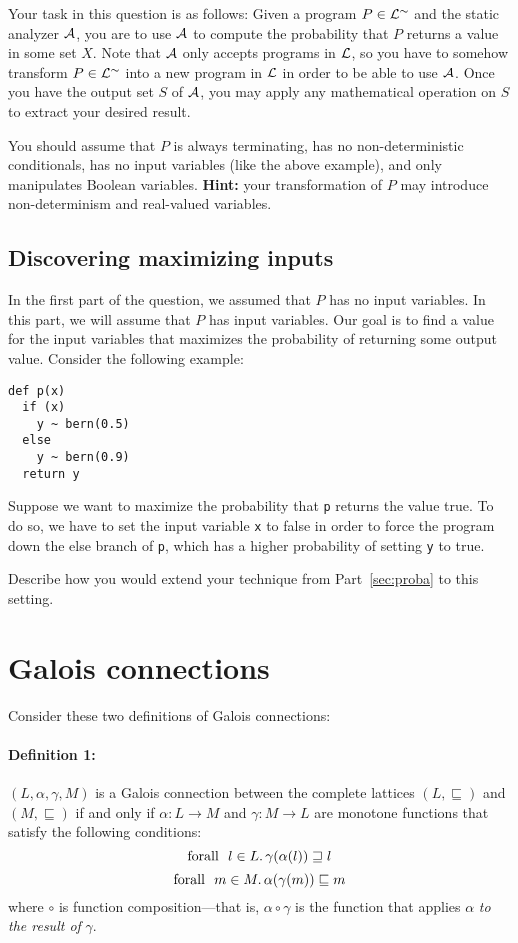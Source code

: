 \documentclass[11pt, oneside]{article}   	%
\begin{document}
Your task in this question is as follows:
Given a program $P \in \mathcal{L}^\sim$ and the static
analyzer $\mathcal{A}$, you are to use $\mathcal{A}$
to compute the probability that $P$ returns
a value in some set $X$.
Note that $\mathcal{A}$ only accepts programs in $\mathcal{L}$,
so you have to somehow transform $P \in \mathcal{L}^\sim$ into a new
program in $\mathcal{L}$
in order to be able to use $\mathcal{A}$.
Once you have the output set $S$ of $\mathcal{A}$,
you may apply any mathematical  operation on $S$ to
extract your desired result.

You should assume that $P$ is always terminating,
has no non-deterministic conditionals,
has no input variables (like the above example),
and only manipulates Boolean variables.
\textbf{Hint:} your transformation of $P$
may introduce non-determinism and real-valued variables.

\subsection{Discovering maximizing inputs}
In the first part of the question,
we assumed that $P$ has no input variables.
In this part, we will assume that $P$ has input variables.
Our goal is to find a value for the input variables
that maximizes the probability of returning some output value.
Consider the following example:
\begin{verbatim}
def p(x)
  if (x)
    y ~ bern(0.5)
  else
    y ~ bern(0.9)
  return y
\end{verbatim}
Suppose we want to maximize the probability
that \texttt{p} returns the value true.
To do so, we have to set the input variable \texttt{x}
to false in order to force the program down the
else branch of \texttt{p}, which has a higher
probability of setting \texttt{y} to true.

Describe how you would extend your
technique from Part~\ref{sec:proba} to this setting.

\section{Galois connections}
Consider these two definitions of Galois connections:

\paragraph{Definition 1:}
$(L,\alpha,\gamma,M)$ is a Galois connection
between the complete lattices $(L,\sqsubseteq)$
and $(M,\sqsubseteq)$ if and only if
$\alpha:L \rightarrow M$ and $\gamma:M \rightarrow L$
are monotone functions that satisfy the following conditions:
$$\text{forall }~ l \in L \ldotp \gamma(\alpha(l)) \sqsupseteq l$$
$$\text{forall }~ m \in M \ldotp \alpha(\gamma(m)) \sqsubseteq m$$
where $\circ$ is function composition---that is,
$\alpha \circ \gamma$ is the function that applies
$\alpha$ \emph{to the result of} $\gamma$.
\end{document}
